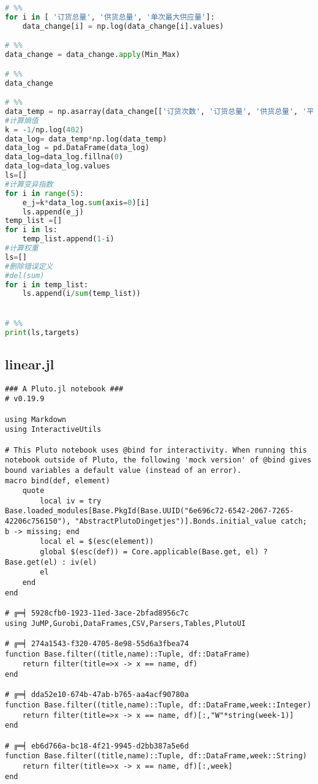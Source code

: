 \begin{appendices}
\begin{lstlisting}[language=python]
# %%
for i in [ '订货总量', '供货总量', '单次最大供应量']:
    data_change[i] = np.log(data_change[i].values)

# %%
data_change = data_change.apply(Min_Max)

# %%
data_change

# %%
data_temp = np.asarray(data_change[['订货次数', '订货总量', '供货总量', '平均供货偏差', '单次最大供应量']])
#计算熵值
k = -1/np.log(402)
data_log= data_temp*np.log(data_temp)
data_log = pd.DataFrame(data_log)
data_log=data_log.fillna(0)
data_log=data_log.values
ls=[]
#计算变异指数
for i in range(5):
    e_j=k*data_log.sum(axis=0)[i]
    ls.append(e_j)
temp_list =[]
for i in ls:
    temp_list.append(1-i)
#计算权重
ls=[]
#删除错误定义
#del(sum)
for i in temp_list:
    ls.append(i/sum(temp_list))


# %%
print(ls,targets)

\end{lstlisting}

\subsection{linear.jl}

\begin{lstlisting}
### A Pluto.jl notebook ###
# v0.19.9

using Markdown
using InteractiveUtils

# This Pluto notebook uses @bind for interactivity. When running this notebook outside of Pluto, the following 'mock version' of @bind gives bound variables a default value (instead of an error).
macro bind(def, element)
    quote
        local iv = try Base.loaded_modules[Base.PkgId(Base.UUID("6e696c72-6542-2067-7265-42206c756150"), "AbstractPlutoDingetjes")].Bonds.initial_value catch; b -> missing; end
        local el = $(esc(element))
        global $(esc(def)) = Core.applicable(Base.get, el) ? Base.get(el) : iv(el)
        el
    end
end

# ╔═╡ 5928cfb0-1923-11ed-3ace-2bfad8956c7c
using JuMP,Gurobi,DataFrames,CSV,Parsers,Tables,PlutoUI

# ╔═╡ 274a1543-f320-4705-8e98-55d6a3fbea74
function Base.filter((title,name)::Tuple, df::DataFrame)
	return filter(title=>x -> x == name, df)
end

# ╔═╡ dda52e10-674b-47ab-b765-aa4acf90780a
function Base.filter((title,name)::Tuple, df::DataFrame,week::Integer)
	return filter(title=>x -> x == name, df)[:,"W"*string(week-1)]
end

# ╔═╡ eb6d766a-bc18-4f21-9945-d2bb387a5e6d
function Base.filter((title,name)::Tuple, df::DataFrame,week::String)
	return filter(title=>x -> x == name, df)[:,week]
end


\end{lstlisting}
\end{appendices}
